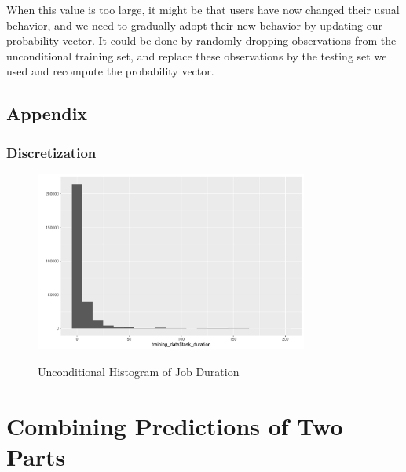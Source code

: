 \documentclass{article}
\begin{document}
\begin{flushleft}
When this value is too large, it might be that users have now changed their usual behavior, and we need to gradually adopt their new behavior by updating our probability vector. It could be done by randomly dropping observations from the unconditional training set, and replace these observations by the testing set we used and recompute the probability vector.
\end{flushleft}

\subsection{Appendix}

\subsubsection{Discretization}

\begin{figure}[htbp]
\caption{Unconditional Histogram of Job Duration}
\centering
\includegraphics[width = 0.8\textwidth]{uncondional_hist}
\label{fig:fig2.2.1}
\end{figure}

\section{Combining Predictions of Two Parts}
\end{document}
